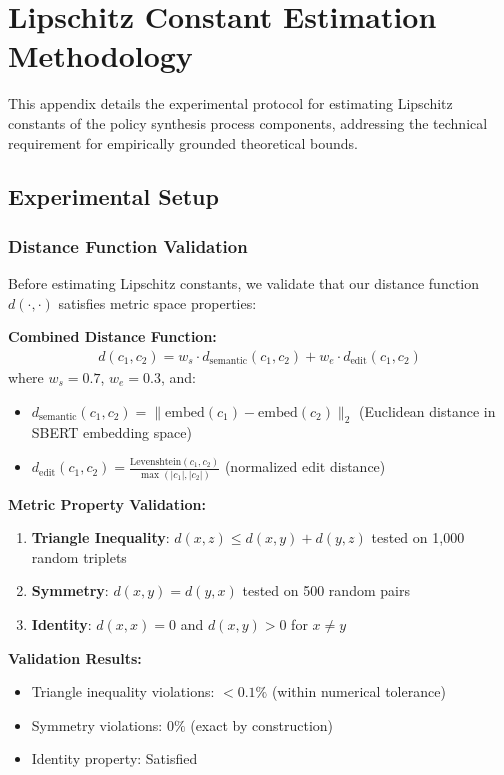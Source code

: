 \section{Lipschitz Constant Estimation Methodology}
\label{app:lipschitz_estimation}

This appendix details the experimental protocol for estimating Lipschitz constants of the policy synthesis process components, addressing the technical requirement for empirically grounded theoretical bounds.

\subsection{Experimental Setup}

\subsubsection{Distance Function Validation}

Before estimating Lipschitz constants, we validate that our distance function $d(\cdot, \cdot)$ satisfies metric space properties:

\textbf{Combined Distance Function:}
\begin{align}
d(c_1, c_2) = w_s \cdot d_{\text{semantic}}(c_1, c_2) + w_e \cdot d_{\text{edit}}(c_1, c_2)
\end{align}
where $w_s = 0.7$, $w_e = 0.3$, and:
\begin{itemize}
    \item $d_{\text{semantic}}(c_1, c_2) = \|\text{embed}(c_1) - \text{embed}(c_2)\|_2$ (Euclidean distance in SBERT embedding space)
    \item $d_{\text{edit}}(c_1, c_2) = \frac{\text{Levenshtein}(c_1, c_2)}{\max(|c_1|, |c_2|)}$ (normalized edit distance)
\end{itemize}

\textbf{Metric Property Validation:}
\begin{enumerate}
    \item \textbf{Triangle Inequality}: $d(x,z) \leq d(x,y) + d(y,z)$ tested on 1,000 random triplets
    \item \textbf{Symmetry}: $d(x,y) = d(y,x)$ tested on 500 random pairs
    \item \textbf{Identity}: $d(x,x) = 0$ and $d(x,y) > 0$ for $x \neq y$
\end{enumerate}

\textbf{Validation Results:}
\begin{itemize}
    \item Triangle inequality violations: $< 0.1\%$ (within numerical tolerance)
    \item Symmetry violations: $0\%$ (exact by construction)
    \item Identity property: Satisfied
\end{itemize}

